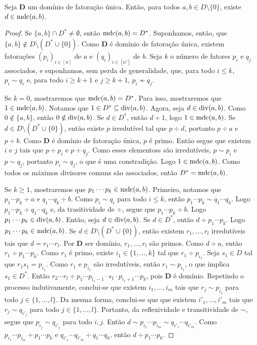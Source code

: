 \begin{prop}
Seja $\bm D$ um domínio de fatoração única. Então, para todos $a,b \in D \setminus \{0\}$, existe $d \in \operatorname{mdc}(a,b)$.
\end{prop}
\begin{proof}
Se $\{a,b\} \cap D^* \neq \emptyset$, então $\operatorname{mdc}(a,b) = D^*$. Suponhamos, então, que $\{a,b\} \notin D \setminus (D^* \cup \{0\})$.
Como $\bm D$ é domínio de fatoração única, existem fatorações $(p_i)_{i \in [n]}$ de $a$ e $(q_i)_{i \in [n']}$ de $b$. Seja $k$ o número de fatores $p_i$ e $q_j$ associados, e suponhamos, sem perda de generalidade, que, para todo $i \leq k$, $p_i \sim q_i$ e, para todo $i \geq k+1$ e $j\geq k+1$, $p_i \not\sim q_j$.

Se $k=0$, mostraremos que $\operatorname{mdc}(a,b) = D^*$. Para isso, mostraremos que $1 \in \operatorname{mdc}(a,b)$. Notamos que $1 \in D^* \subseteq \operatorname{div}(a,b)$. Agora, seja $d \in \operatorname{div}(a,b)$. Como $0 \notin \{a,b\}$, então $0 \notin \operatorname{div}(a,b)$. Se $d \in D^*$, então $d \div 1$, logo $1 \in \operatorname{mdc}(a,b)$. Se $d \in D \setminus (D^* \cup \{0\})$, então existe $p$ irredutível tal que $p \div d$, portanto $p \div a$ e $p \div b$. Como $\bm D$ é domínio de fatoração única, $p$ é primo. Então segue que existem $i$ e $j$ tais que $p \div p_i$ e $p \div q_j$. Como esses elementoss são irredutíveis, $p \sim p_i$ e $p \sim q_j$, portanto $p_i \sim q_j$, o que é uma constradição. Logo $1 \in \operatorname{mdc}(a,b)$. Como todos os máximos divisores comuns são associados, então $D^* = \operatorname{mdc}(a,b)$.

Se $k \geq 1$, mostraremos que $p_1 \cdots p_k \in \operatorname{mdc}(a,b)$. Primeiro, notamos que $p_1 \cdots p_k \div a$ e $q_1 \cdots q_k \div b$. Como $p_i \sim q_i$ para todo $i \leq k$, então $p_1 \cdots p_k \sim q_1 \cdots q_k$. Logo $p_1 \cdots p_k \div q_1 \cdots q_k$ e, da trasitividade de $\div$, segue que $p_1 \cdots p_k \div b$. Logo $p_1 \cdots p_k \in \operatorname{div}(a,b)$. Então, seja $d \in \operatorname{div}(a,b)$. Se $d \in D^*$, então $d \div p_1 \cdots p_k$. Logo $p_1 \cdots p_k \in \operatorname{mdc}(a,b)$. Se $d \in D \setminus (D^* \cup \{0\})$, então existem $r_1,\ldots,r_l$ irredutíveis tais que $d = r_1 \cdots r_l$. Por $\bm D$ ser domínio, $r_1,\ldots,r_l$ são primos. Como $d \div a$, então $r_1 \div p_1 \cdots p_k$. Como $r_1$ é primo, existe $i_1 \in \{1,\ldots,k\}$ tal que $r_1 \div p_{i_1}$. Seja $s_1 \in D$ tal que $r_1s_1 = p_{i_1}$. Como $r_1$ e $p_{i_1}$ são irredutíveis, então $r_1 \sim p_{i_1}$, o que implica $s_1 \in D^*$. Então $r_2 \cdots r_l \div p_1 \cdots p_{i_1-1} \cdot s_1 \cdot p_{i_1+1} \cdots p_k$, pois $\bm D$ é domínio. Repetindo o processo indutivamente, conclui-se que existem $i_1, \ldots,i_m$ tais que $r_j \sim p_{i_j}$ para todo $j \in \{1,\ldots,l\}$.
Da mesma forma, conclui-se que que existem $i'_1, \ldots,i'_m$ tais que $r_j \sim q_{i'_j}$ para todo $j \in \{1,\ldots,l\}$. Portanto, da reflexividade e transitividade de $\sim$, segue que $p_{i_j} \sim q_{i'_j}$ para todo $i,j$. Então $d \sim p_{i_1} \cdots p_{i_m} \sim q_{i'_1} \cdots q_{i'_m}$. Como $p_{i_1} \cdots p_{i_m} \div p_1 \cdots p_k$ e $q_{i'_1} \cdots q_{i'_m} \div q_1 \cdots q_k$, então $d \div p_1 \cdots p_k$.
\end{proof}


